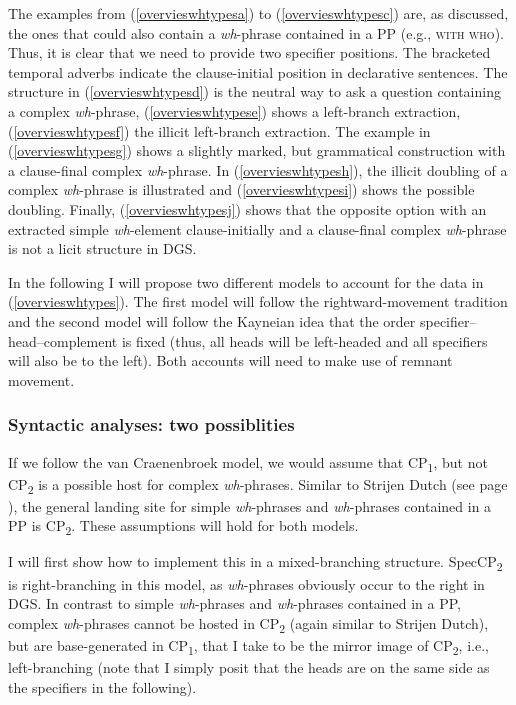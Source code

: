 \noindent The examples from (\ref{overvieswhtypesa}) to (\ref{overvieswhtypesc}) are, as discussed, the ones that could also contain a \textit{wh}-phrase contained in a PP (e.g., \textsc{with who}). Thus, it is clear that we need to provide two specifier positions. The bracketed temporal adverbs indicate the clause-initial position in declarative sentences. The structure in (\ref{overvieswhtypesd}) is the neutral way to ask a question containing a complex \textit{wh}-phrase, (\ref{overvieswhtypese}) shows a left-branch extraction, (\ref{overvieswhtypesf}) the illicit left-branch extraction. The example in (\ref{overvieswhtypesg}) shows a slightly marked, but grammatical construction with a clause-final complex \textit{wh}-phrase. In (\ref{overvieswhtypesh}), the illicit doubling of a complex \textit{wh}-phrase is illustrated and (\ref{overvieswhtypesi}) shows the possible doubling. Finally, (\ref{overvieswhtypesj}) shows that the opposite option with an extracted simple \textit{wh}-element clause-initially and a clause-final complex \textit{wh}-phrase is not a licit structure in DGS.

In the following I will propose two different models to account for the data in (\ref{overvieswhtypes}). The first model will follow the rightward-movement tradition and the second model will follow the Kayneian idea that the order specifier--head--com\-ple\-ment is fixed (thus, all heads will be left-headed and all specifiers will also be to the left). Both accounts will need to make use of remnant movement.

\subsubsection{Syntactic analyses: two possiblities}

If we follow the van Craenenbroek model, we would assume that CP\textsubscript{1}, but not CP\textsubscript{2} is a possible host for complex \textit{wh}-phrases. Similar to Strijen Dutch (see page \pageref{vancraenenbroekdutchdialecta}), the general landing site for simple \textit{wh}-phrases and \textit{wh}-phrases contained in a PP is CP\textsubscript{2}. These assumptions will hold for both models.

I will first show how to implement this in a mixed-branching structure. SpecCP\textsubscript{2} is right-branching in this model, as \textit{wh}-phrases obviously occur to the right in DGS. In contrast to simple \textit{wh}-phrases and \textit{wh}-phrases contained in a PP, complex \textit{wh}-phrases cannot be hosted in CP\textsubscript{2} (again similar to Strijen Dutch), but are base-generated in CP\textsubscript{1}, that I take to be the mirror image of CP\textsubscript{2}, i.e., left-branching (note that I simply posit that the heads are on the same side as the specifiers in the following). 

